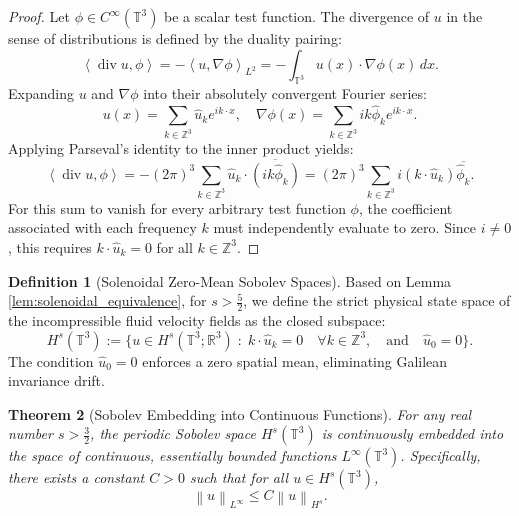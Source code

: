 \documentclass[12pt,a4paper]{article}
\theoremstyle{plain}
\newtheorem{theorem}{Theorem}[section]
\theoremstyle{definition}
\newtheorem{definition}[theorem]{Definition}
\theoremstyle{remark}
\newcommand{\Hs}{H^s}
\newcommand{\T}{\mathbb{T}}
\newcommand{\Z}{\mathbb{Z}}
\newcommand{\R}{\mathbb{R}}
\newcommand{\norm}[1]{\left\|#1\right\|}
\newcommand{\inner}[2]{\left\langle #1, #2 \right\rangle}
\newcommand{\dive}{\operatorname{div}}
\newcommand{\grad}{\nabla}
\begin{document}
\begin{proof}
Let $\phi \in C^\infty(\T^3)$ be a scalar test function. The divergence of $u$ in the sense of distributions is defined by the duality pairing:
\[
  \inner{\dive u}{\phi} = -\inner{u}{\grad \phi}_{L^2} = -\int_{\T^3} u(x) \cdot \grad \phi(x) \,dx.
\]
Expanding $u$ and $\grad \phi$ into their absolutely convergent Fourier series:
\[
  u(x) = \sum_{k \in \Z^3} \hat{u}_k e^{ik \cdot x}, \quad \grad \phi(x) = \sum_{k \in \Z^3} i k \hat{\phi}_k e^{ik \cdot x}.
\]
Applying Parseval's identity to the inner product yields:
\[
  \inner{\dive u}{\phi} = -(2\pi)^3 \sum_{k \in \Z^3} \hat{u}_k \cdot \overline{(i k \hat{\phi}_k)} = (2\pi)^3 \sum_{k \in \Z^3} i (k \cdot \hat{u}_k) \overline{\hat{\phi}_k}.
\]
For this sum to vanish for every arbitrary test function $\phi$, the coefficient associated with each frequency $k$ must independently evaluate to zero. Since $i \neq 0$, this requires $k \cdot \hat{u}_k = 0$ for all $k \in \Z^3$.
\end{proof}

\begin{definition}[Solenoidal Zero-Mean Sobolev Spaces]
\label{def:Hssigma}
Based on Lemma \ref{lem:solenoidal_equivalence}, for $s > \frac{5}{2}$, we define the strict physical state space of the incompressible fluid velocity fields as the closed subspace:
\[
  \Hs(\T^3)
  :=
  \Big\{
    u \in H^s(\T^3;\R^3)
    \;:\;
    k \cdot \hat{u}_k = 0 \quad \forall k \in \Z^3, \quad \text{and} \quad \hat{u}_0 = 0
  \Big\}.
\]
The condition $\hat{u}_0 = 0$ enforces a zero spatial mean, eliminating Galilean invariance drift.
\end{definition}

\begin{theorem}[Sobolev Embedding into Continuous Functions]
\label{thm:sobolev_embedding}
For any real number $s > \frac{3}{2}$, the periodic Sobolev space $H^s(\T^3)$ is continuously embedded into the space of continuous, essentially bounded functions $L^\infty(\T^3)$. Specifically, there exists a constant $C > 0$ such that for all $u \in H^s(\T^3)$,
\[
  \norm{u}_{L^\infty} \le C \norm{u}_{H^s}.
\]
\end{theorem}
\end{document}
